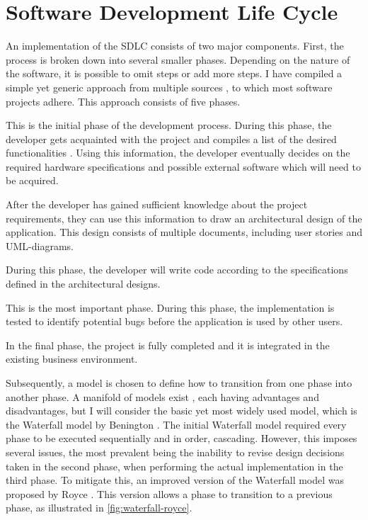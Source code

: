 \section{Software Development Life Cycle}\label{sec:se-sdlc}
An implementation of the SDLC consists of two major components. First, the process is broken down into several smaller phases. Depending on the nature of the software, it is possible to omit steps or add more steps. I have compiled a simple yet generic approach from multiple sources \cite{2010govardhan, 7106435}, to which most software projects adhere. This approach consists of five phases.
\begin{enumerate}
	 This is the initial phase of the development process. During this phase, the developer gets acquainted with the project and compiles a list of the desired functionalities \cite{7106435}. Using this information, the developer eventually decides on the required hardware specifications and possible external software which will need to be acquired.
	
	 After the developer has gained sufficient knowledge about the project requirements, they can use this information to draw an architectural design of the application. This design consists of multiple documents, including user stories and UML-diagrams.
	
	 During this phase, the developer will write code according to the specifications defined in the architectural designs.
	
	 This is the most important phase. During this phase, the implementation is tested to identify potential bugs before the application is used by other users.
	
	 In the final phase, the project is fully completed and it is integrated in the existing business environment.
\end{enumerate}

\noindent Subsequently, a model is chosen to define how to transition from one phase into another phase. A manifold of models exist \cite{2010govardhan}, each having advantages and disadvantages, but I will consider the basic yet most widely used model, which is the Waterfall model by Benington \cite{united1956symposium}. The initial Waterfall model required every phase to be executed sequentially and in order, cascading. However, this imposes several issues, the most prevalent being the inability to revise design decisions taken in the second phase, when performing the actual implementation in the third phase. To mitigate this, an improved version of the Waterfall model was proposed by Royce \cite{Royce:1987:MDL:41765.41801}. This version allows a phase to transition to a previous phase, as illustrated in \autoref{fig:waterfall-royce}.

